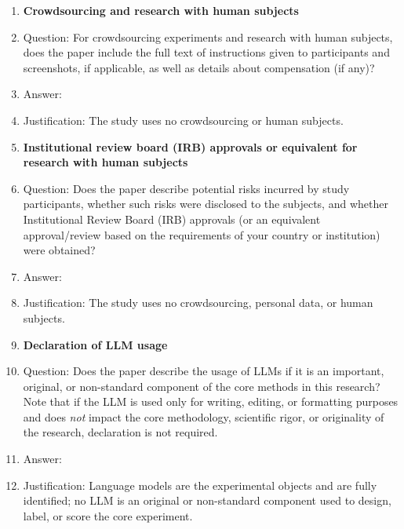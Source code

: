\begin{enumerate}
\item {\bf Crowdsourcing and research with human subjects}
  \item[] Question: For crowdsourcing experiments and research with human subjects, does the paper include the full text of instructions given to participants and screenshots, if applicable, as well as details about compensation (if any)?
  \item[] Answer: \answerNA{}
  \item[] Justification: The study uses no crowdsourcing or human subjects.

\item {\bf Institutional review board (IRB) approvals or equivalent for research with human subjects}
  \item[] Question: Does the paper describe potential risks incurred by study participants, whether such risks were disclosed to the subjects, and whether Institutional Review Board (IRB) approvals (or an equivalent approval/review based on the requirements of your country or institution) were obtained?
  \item[] Answer: \answerNA{}
  \item[] Justification: The study uses no crowdsourcing, personal data, or human subjects.

\item {\bf Declaration of LLM usage}
  \item[] Question: Does the paper describe the usage of LLMs if it is an important, original, or non-standard component of the core methods in this research? Note that if the LLM is used only for writing, editing, or formatting purposes and does \emph{not} impact the core methodology, scientific rigor, or originality of the research, declaration is not required.
  \item[] Answer: \answerNA{}
  \item[] Justification: Language models are the experimental objects and are fully identified; no LLM is an original or non-standard component used to design, label, or score the core experiment.

\end{enumerate}
